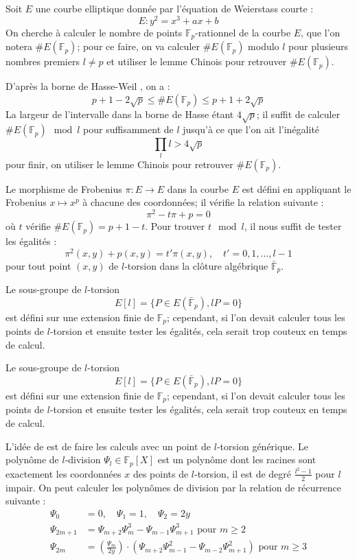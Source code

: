 \documentclass[a4paper]{article}
\theoremstyle{definition}
\theoremstyle{remark}
\numberwithin{equation}{section}
\begin{document}
Soit $E$ une courbe elliptique donnée par l'équation de Weierstass courte :
$$E : y^2 = x^3 + ax + b$$
On cherche à calculer le nombre de points $\mathbb{F}_p$-rationnel de la courbe $E$, que l'on notera $\#E(\mathbb{F}_p)$; pour ce faire, on va calculer $\#E(\mathbb{F}_p)$ modulo $l$ pour plusieurs nombres premiers $l \neq p$ et utiliser le lemme Chinois pour retrouver $\#E(\mathbb{F}_p)$.

D'après la borne de Hasse-Weil \citep{weil}, on a :
$$p+1 - 2\sqrt{p} \leq \#E(\mathbb{F}_p) \leq p+1 + 2\sqrt{p}$$
La largeur de l'intervalle dans la borne de Hasse étant $4\sqrt{p}$; il suffit de calculer $\#E(\mathbb{F}_p) \mod l$ pour suffisamment de $l$ jusqu'à ce que l'on ait l'inégalité
\begin{equation}
\label{inegaliteSchoof}
\prod_l l > 4\sqrt{p}
\end{equation}
pour finir, on utiliser le lemme Chinois pour retrouver $\#E(\mathbb{F}_p)$.

Le morphisme de Frobenius $\pi : E \longrightarrow E$ dans la courbe $E$ est défini en appliquant le Frobenius $x \mapsto x^p$ à chacune des coordonnées; il vérifie la relation suivante :
$$\pi^2 - t\pi + p = 0$$
où $t$ vérifie $\#E(\mathbb{F}_p) = p + 1 - t$. Pour trouver $t \mod l$, il nous suffit de tester les égalités :
$$\pi^2(x,y) + p(x,y) = t'\pi(x,y), \quad t' = 0,1,...,l-1$$
pour tout point $(x,y)$ de $l$-torsion dans la clôture algébrique $\bar{\mathbb{F}}_p$.

Le sous-groupe de $l$-torsion
$$E[l] = \{P \in E(\bar{\mathbb{F}}_p), lP = 0\}$$
est défini sur une extension finie de $\mathbb{F}_p$; cependant, si l'on devait calculer tous les points de $l$-torsion et ensuite tester les égalités, cela serait trop couteux en temps de calcul.

Le sous-groupe de $l$-torsion
$$E[l] = \{P \in E(\bar{\mathbb{F}}_p), lP = 0\}$$
est défini sur une extension finie de $\mathbb{F}_p$; cependant, si l'on devait calculer tous les points de $l$-torsion et ensuite tester les égalités, cela serait trop couteux en temps de calcul.

L'idée de \citet{schoof} est de faire les calculs avec un point de $l$-torsion générique. Le polynôme de $l$-division $\Psi_l \in \mathbb{F}_p[X]$ est un polynôme dont les racines sont exactement les coordonnées $x$ des points de $l$-torsion, il est de degré $\frac{l^2-1}{2}$ pour $l$ impair. On peut calculer les polynômes de division par la relation de récurrence suivante :
\begin{align*}
\Psi_{0} &= 0, \quad \Psi_{1} = 1, \quad \Psi_{2} = 2y \\
\Psi_{2m+1} &=  \Psi_{m+2} \Psi_{m}^{ 3}  -  \Psi_{m-1} \Psi ^{ 3}_{ m+1} \text{ pour } m \geq 2 \\
\Psi_{ 2m} &=  \left ( \frac { \Psi_{m}}{2y} \right ) \cdot ( \Psi_{m+2}\Psi^{ 2}_{m-1} -  \Psi_{m-2} \Psi ^{ 2}_{m+1})   \text{ pour } m \geq 3
\end{align*}
\end{document}
